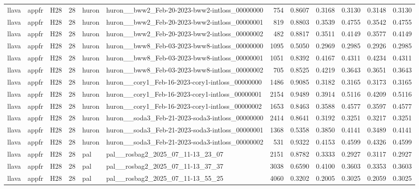 \begin{table}[tbp]
\begin{tabular}{lllrllrrrrrr}
llava & appfr & H28 & 28 & huron & huron\_\_bww2\_Feb-20-2023-bww2-intloss\_00000000 & 754 & 0.8607 & 0.3168 & 0.3130 & 0.3148 & 0.3130 \\
llava & appfr & H28 & 28 & huron & huron\_\_bww2\_Feb-20-2023-bww2-intloss\_00000001 & 819 & 0.8803 & 0.3539 & 0.4755 & 0.3542 & 0.4755 \\
llava & appfr & H28 & 28 & huron & huron\_\_bww2\_Feb-20-2023-bww2-intloss\_00000002 & 482 & 0.8817 & 0.3511 & 0.4149 & 0.3577 & 0.4149 \\
llava & appfr & H28 & 28 & huron & huron\_\_bww8\_Feb-03-2023-bww8-intloss\_00000000 & 1095 & 0.5050 & 0.2969 & 0.2985 & 0.2926 & 0.2985 \\
llava & appfr & H28 & 28 & huron & huron\_\_bww8\_Feb-03-2023-bww8-intloss\_00000001 & 1051 & 0.8392 & 0.4167 & 0.4311 & 0.4234 & 0.4311 \\
llava & appfr & H28 & 28 & huron & huron\_\_bww8\_Feb-03-2023-bww8-intloss\_00000002 & 705 & 0.8525 & 0.4219 & 0.3643 & 0.3651 & 0.3643 \\
llava & appfr & H28 & 28 & huron & huron\_\_cory1\_Feb-16-2023-cory1-intloss\_00000000 & 1486 & 0.9085 & 0.3182 & 0.3165 & 0.3173 & 0.3165 \\
llava & appfr & H28 & 28 & huron & huron\_\_cory1\_Feb-16-2023-cory1-intloss\_00000001 & 2154 & 0.9489 & 0.3914 & 0.5116 & 0.4209 & 0.5116 \\
llava & appfr & H28 & 28 & huron & huron\_\_cory1\_Feb-16-2023-cory1-intloss\_00000002 & 1653 & 0.8463 & 0.3588 & 0.4577 & 0.3597 & 0.4577 \\
llava & appfr & H28 & 28 & huron & huron\_\_soda3\_Feb-21-2023-soda3-intloss\_00000000 & 2414 & 0.8641 & 0.3192 & 0.3251 & 0.3217 & 0.3251 \\
llava & appfr & H28 & 28 & huron & huron\_\_soda3\_Feb-21-2023-soda3-intloss\_00000001 & 1368 & 0.5358 & 0.3850 & 0.4141 & 0.3489 & 0.4141 \\
llava & appfr & H28 & 28 & huron & huron\_\_soda3\_Feb-21-2023-soda3-intloss\_00000002 & 531 & 0.9322 & 0.4153 & 0.4599 & 0.4326 & 0.4599 \\
llava & appfr & H28 & 28 & pal & pal\_\_rosbag2\_2025\_07\_11-13\_23\_07 & 2151 & 0.8782 & 0.3333 & 0.2927 & 0.3117 & 0.2927 \\
llava & appfr & H28 & 28 & pal & pal\_\_rosbag2\_2025\_07\_11-13\_37\_37 & 3038 & 0.6590 & 0.4100 & 0.3603 & 0.3353 & 0.3603 \\
llava & appfr & H28 & 28 & pal & pal\_\_rosbag2\_2025\_07\_11-13\_55\_25 & 4060 & 0.3202 & 0.2005 & 0.3025 & 0.2059 & 0.3025 \\

\end{tabular}
\end{table}
